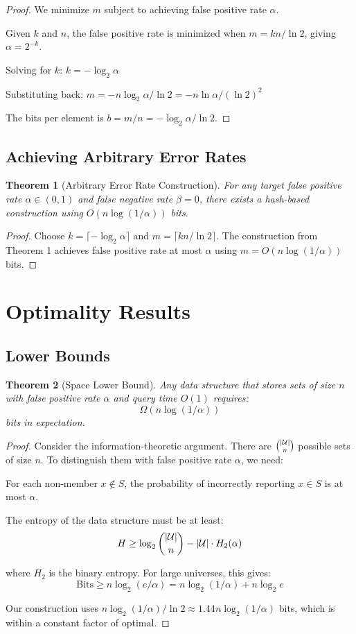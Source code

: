 \documentclass[11pt]{article}
\newtheorem{theorem}{Theorem}
\begin{document}
\begin{proof}
We minimize $m$ subject to achieving false positive rate $\alpha$.

Given $k$ and $n$, the false positive rate is minimized when $m = kn/\ln 2$, giving $\alpha = 2^{-k}$.

Solving for $k$: $k = -\log_2 \alpha$

Substituting back: $m = -n \log_2 \alpha / \ln 2 = -n \ln \alpha / (\ln 2)^2$

The bits per element is $b = m/n = -\log_2 \alpha / \ln 2$.
\end{proof}

\subsection{Achieving Arbitrary Error Rates}

\begin{theorem}[Arbitrary Error Rate Construction]
For any target false positive rate $\alpha \in (0, 1)$ and false negative rate $\beta = 0$, there exists a hash-based construction using $O(n \log(1/\alpha))$ bits.
\end{theorem}

\begin{proof}
Choose $k = \lceil -\log_2 \alpha \rceil$ and $m = \lceil kn/\ln 2 \rceil$. The construction from Theorem 1 achieves false positive rate at most $\alpha$ using $m = O(n \log(1/\alpha))$ bits.
\end{proof}

\section{Optimality Results}

\subsection{Lower Bounds}

\begin{theorem}[Space Lower Bound]
Any data structure that stores sets of size $n$ with false positive rate $\alpha$ and query time $O(1)$ requires:
$$\Omega(n \log(1/\alpha))$$
bits in expectation.
\end{theorem}

\begin{proof}
Consider the information-theoretic argument. There are $\binom{|\mathcal{U}|}{n}$ possible sets of size $n$. To distinguish them with false positive rate $\alpha$, we need:

For each non-member $x \notin S$, the probability of incorrectly reporting $x \in S$ is at most $\alpha$.

The entropy of the data structure must be at least:
$$H \geq \log_2 \binom{|\mathcal{U}|}{n} - |\mathcal{U}| \cdot H_2(\alpha)$$

where $H_2$ is the binary entropy. For large universes, this gives:
$$\text{Bits} \geq n \log_2(e/\alpha) = n \log_2(1/\alpha) + n \log_2 e$$

Our construction uses $n \log_2(1/\alpha) / \ln 2 \approx 1.44n \log_2(1/\alpha)$ bits, which is within a constant factor of optimal.
\end{proof}
\end{document}
